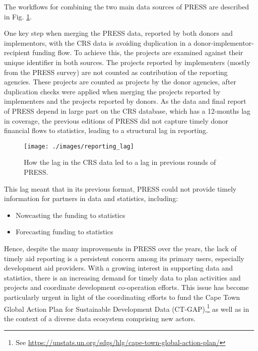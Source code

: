 \documentclass[
]{article}
\begin{document}
The workflows for combining the two main data sources of PRESS are described in Fig. \ref{fig:reporting-lag}.

One key step when merging the PRESS data, reported by both donors and implementors, with the CRS
data is avoiding duplication in a donor‐implementor‐recipient funding flow. To achieve this, the
projects are examined against their unique identifier in both sources. The projects reported by
implementers (mostly from the PRESS survey) are not counted as contribution of the reporting
agencies. These projects are counted as projects by the donor agencies, after duplication checks were
applied when merging the projects reported by implementers and the projects reported by donors.
As the data and final report of PRESS depend in large part on the CRS database, which has a 12‐months
lag in coverage, the previous editions of PRESS did not capture timely donor financial flows to
statistics, leading to a structural lag in reporting.

\begin{figure}

{\centering \texttt{[image: ./images/reporting\_lag]} 

}

\caption{How the lag in the CRS data led to a lag in previous rounds of PRESS.}\label{fig:reporting-lag}
\end{figure}

This lag meant that in its previous format, PRESS could not provide timely information for partners in
data and statistics, including:

\begin{itemize}
\item
  Nowcasting the funding to statistics
\item
  Forecasting funding to statistics
\end{itemize}

Hence, despite the many improvements in PRESS over the years, the lack of timely aid reporting is a
persistent concern among its primary users, especially development aid providers. With a growing
interest in supporting data and statistics, there is an increasing demand for timely data to plan
activities and projects and coordinate development co‐operation efforts. This issue has become
particularly urgent in light of the coordinating efforts to fund the Cape Town Global Action Plan for
Sustainable Development Data (CT‐GAP),\footnote{See \url{https://unstats.un.org/sdgs/hlg/cape-town-global-action-plan/}} as well as in the context of a diverse data ecosystem comprising new actors.
\end{document}
